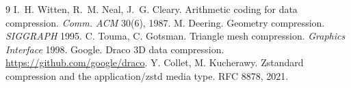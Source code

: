 \documentclass[11pt,a4paper]{article}
\begin{document}
\begin{thebibliography}{9}
 I.~H. Witten, R.~M. Neal, J.~G. Cleary. Arithmetic coding for data compression. \emph{Comm. ACM} 30(6), 1987.
 M. Deering. Geometry compression. \emph{SIGGRAPH} 1995.
 C. Touma, C. Gotsman. Triangle mesh compression. \emph{Graphics Interface} 1998.
 Google. Draco 3D data compression. \url{https://github.com/google/draco}.
 Y. Collet, M. Kucherawy. Zstandard compression and the application/zstd media type. RFC 8878, 2021.
\end{thebibliography}
\end{document}
